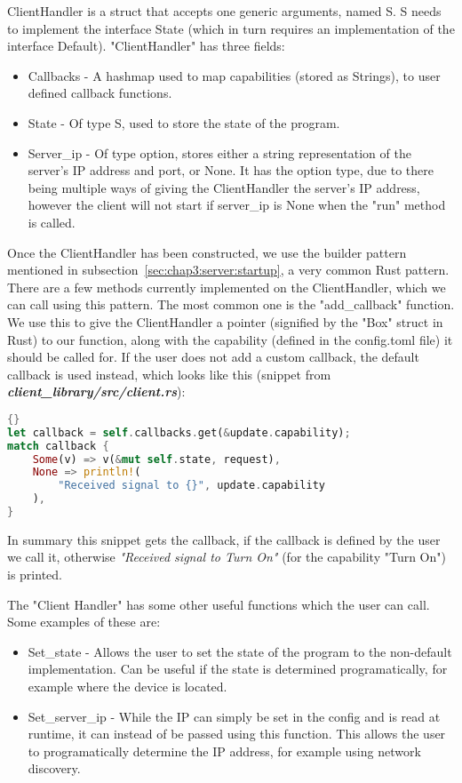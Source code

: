 ClientHandler is a struct that accepts one generic arguments, named S. S needs to implement the interface State (which in turn requires an implementation of the interface Default). "ClientHandler" has three fields:
\begin{itemize}
    \item Callbacks - A hashmap used to map capabilities (stored as Strings), to user defined callback functions.
    \item State - Of type S, used to store the state of the program.
    \item Server\_ip - Of type option, stores either a string representation of the server's IP address and port, or None. It has the option type, due to there being multiple ways of giving the ClientHandler the server's IP address, however the client will not start if server\_ip is None when the "run" method is called.
\end{itemize}

Once the ClientHandler has been constructed, we use the builder pattern mentioned in subsection~\ref{sec:chap3:server:startup}, a very common Rust pattern. There are a few methods currently implemented on the ClientHandler, which we can call using this pattern. The most common one is the "add\_callback" function. We use this to give the ClientHandler a pointer (signified by the "Box" struct in Rust) to our function, along with the capability (defined in the config.toml file) it should be called for. If the user does not add a custom callback, the default callback is used instead, which looks like this (snippet from \textit{\textbf{client\_library/src/client.rs}}):

\begin{lstlisting}[language=Rust, style=boxed, showstringspaces=false]{}
let callback = self.callbacks.get(&update.capability);
match callback {
    Some(v) => v(&mut self.state, request),
    None => println!(
        "Received signal to {}", update.capability
    ),
}
\end{lstlisting}
In summary this snippet gets the callback, if the callback is defined by the user we call it, otherwise \textit{"Received signal to Turn On"} (for the capability "Turn On") is printed.

The "Client Handler" has some other useful functions which the user can call. Some examples of these are:
\begin{itemize}
    \item Set\_state - Allows the user to set the state of the program to the non-default implementation. Can be useful if the state is determined programatically, for example where the device is located.
    \item Set\_server\_ip - While the IP can simply be set in the config and is read at runtime, it can instead of be passed using this function. This allows the user to programatically determine the IP address, for example using network discovery.
\end{itemize}

